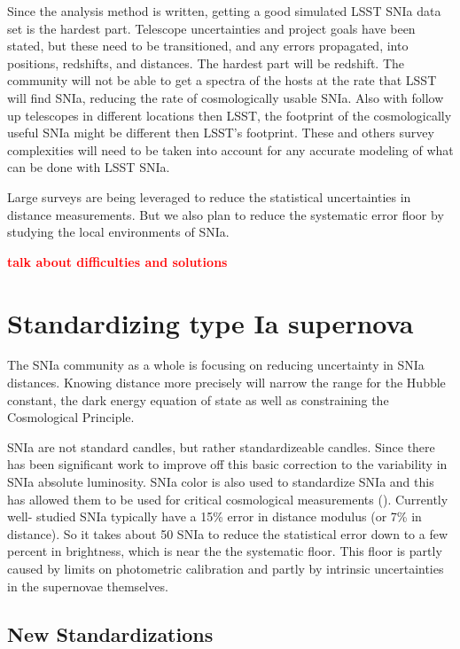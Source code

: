 \documentclass[apj, iop]{emulateapj}
\newcommand{\sn}{SNIa}
\newcommand{\todo}[1]{\textbf{\textcolor{red}{#1}}}
\begin{document}
Since the analysis method is written, getting a good simulated LSST \sn{} data
set is the hardest part. Telescope uncertainties and project goals have been
stated, but these need to be transitioned, and any errors propagated, into
positions,  redshifts, and distances. The hardest part will be redshift. The
community will  not be able to get a spectra of the hosts at the rate that LSST
will find \sn,  reducing the rate of cosmologically usable \sn. Also with follow
up telescopes  in different locations then LSST, the footprint of the
cosmologically useful \sn{} might be different then LSST's footprint. These and
others survey complexities  will need to be taken into account for any accurate
modeling of what can be done with LSST \sn{}.

Large surveys are being leveraged to reduce the statistical uncertainties
in distance measurements. But we also plan to reduce the systematic error floor
by studying the local environments of \sn{}.

\todo{talk about difficulties and solutions}

\section{Standardizing type Ia
supernova}\label{standardizing-type-ia-supernova}

The \sn{} community as a whole is focusing on reducing uncertainty in \sn{}
distances. Knowing distance more precisely will narrow the range for the Hubble
constant, the dark energy equation of state as well as constraining the
Cosmological Principle.

\sn{} are not standard candles, but rather standardizeable candles. Since
\cite{Phillips93} there has been significant work to improve off this basic
correction to the variability in \sn{} absolute luminosity. \sn{} color is also
used to standardize \sn{} and this has allowed them to be used for critical
cosmological measurements (\citep{Riess98, Perlmutter99}). Currently well-
studied \sn{} typically have a 15\% error in distance modulus (or 7\% in
distance). So it takes about 50 \sn{} to reduce the statistical error down to a
few percent in brightness, which is near the the systematic floor. This floor
is partly caused by limits on photometric calibration and partly by intrinsic
uncertainties in the supernovae themselves.

\subsection{New Standardizations}\label{new-standardizations}
\end{document}
